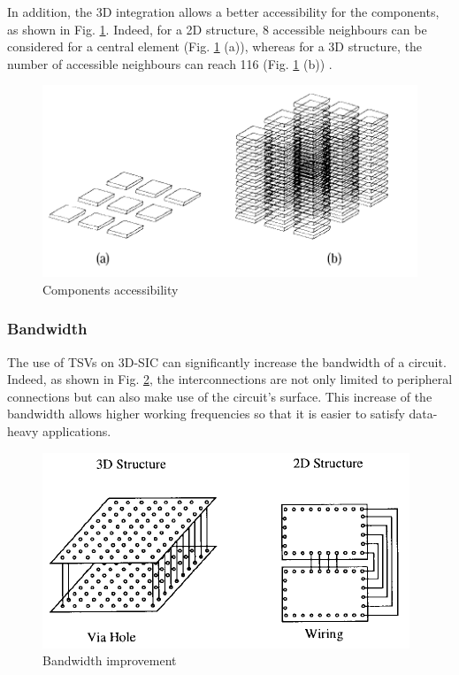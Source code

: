 In addition, the 3D integration allows a better accessibility for the components, as shown in Fig. \ref{fig:accessibility}. Indeed, for a 2D structure, 8 accessible neighbours can be considered for a central element (Fig. \ref{fig:accessibility} (a)), whereas for a 3D structure, the number of accessible neighbours can reach 116 (Fig. \ref{fig:accessibility} (b)) \cite{659500}.

\begin{figure}[h!]
\begin{center}
\includegraphics[width=0.75\linewidth]{accessibility.png}
\end{center}
\vspace{-0.5cm}
\caption{Components accessibility}
\label{fig:accessibility}
\end{figure}

\subsubsection*{Bandwidth}

The use of TSVs on 3D-SIC can significantly increase the bandwidth of a circuit. Indeed, as shown in Fig. \ref{fig:bandwidth}, the interconnections are not only limited to peripheral connections but can also make use of the circuit's surface. This increase of the bandwidth allows higher working frequencies so that it is easier to satisfy data-heavy applications.

\begin{figure}[h!]
\begin{center}
\includegraphics[width=0.75\linewidth]{bandwidth.png}
\end{center}
\vspace{-0.5cm}
\caption{Bandwidth improvement}
\label{fig:bandwidth}
\end{figure}

